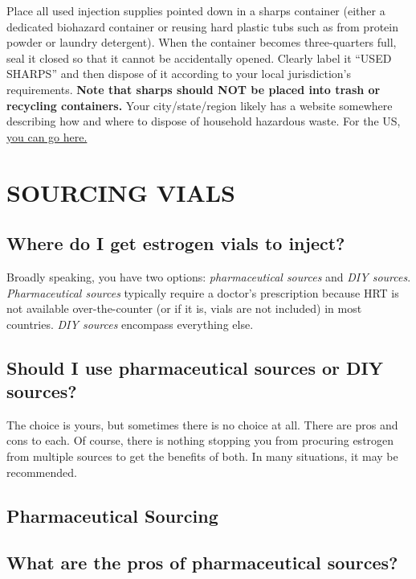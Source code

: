 \documentclass{article}
\begin{document}
Place all used injection supplies pointed down in a sharps container (either a dedicated biohazard container or reusing hard plastic tubs such as from protein powder or laundry detergent). When the container becomes three-quarters full, seal it closed so that it cannot be accidentally opened. Clearly label it “USED SHARPS” and then dispose of it according to your local jurisdiction's requirements. \textbf{Note that sharps should NOT be placed into trash or recycling containers.} Your city/state/region likely has a website somewhere describing how and where to dispose of household hazardous waste. For the US, \href{https://safeneedledisposal.org/}{you can go here.}



\section{SOURCING VIALS}\label{sv}

\subsection{Where do I get estrogen vials to inject?}

Broadly speaking, you have two options: \textit{pharmaceutical sources} and \textit{DIY sources}. \textit{Pharmaceutical sources} typically require a doctor's prescription because HRT is not available over-the-counter (or if it is, vials are not included) in most countries. \textit{DIY sources} encompass everything else.

\subsection{Should I use pharmaceutical sources or DIY sources?}

The choice is yours, but sometimes there is no choice at all. There are pros and cons to each. Of course, there is nothing stopping you from procuring estrogen from multiple sources to get the benefits of both. In many situations, it may be recommended.

\subsection*{Pharmaceutical Sourcing}

\subsection{What are the pros of pharmaceutical sources?}
\end{document}
